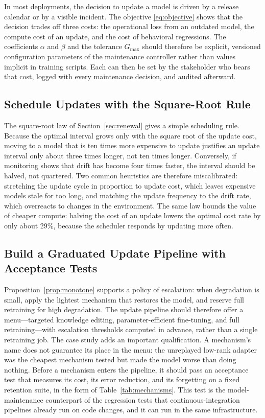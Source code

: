 \documentclass[electronics,article,submit,pdftex,moreauthors]{Definitions/mdpi}
\newcommand{\Gmax}{G_{\max}}
\begin{document}
In most deployments, the decision to update a model is driven by a release calendar or by a visible incident. The objective \eqref{eq:objective} shows that the decision trades off three costs: the operational loss from an outdated model, the compute cost of an update, and the cost of behavioral regressions. The coefficients $\alpha$ and $\beta$ and the tolerance $\Gmax$ should therefore be explicit, versioned configuration parameters of the maintenance controller rather than values implicit in training scripts. Each can then be set by the stakeholder who bears that cost, logged with every maintenance decision, and audited afterward.

\subsection{Schedule Updates with the Square-Root Rule}

The square-root law of Section~\ref{sec:renewal} gives a simple scheduling rule. Because the optimal interval grows only with the square root of the update cost, moving to a model that is ten times more expensive to update justifies an update interval only about three times longer, not ten times longer. Conversely, if monitoring shows that drift has become four times faster, the interval should be halved, not quartered. Two common heuristics are therefore miscalibrated: stretching the update cycle in proportion to update cost, which leaves expensive models stale for too long, and matching the update frequency to the drift rate, which overreacts to changes in the environment. The same law bounds the value of cheaper compute: halving the cost of an update lowers the optimal cost rate by only about 29\%, because the scheduler responds by updating more often.

\subsection{Build a Graduated Update Pipeline with Acceptance Tests}

Proposition~\ref{prop:monotone} supports a policy of escalation: when degradation is small, apply the lightest mechanism that restores the model, and reserve full retraining for high degradation. The update pipeline should therefore offer a menu---targeted knowledge editing, parameter-efficient fine-tuning, and full retraining---with escalation thresholds computed in advance, rather than a single retraining job. The case study adds an important qualification. A mechanism's name does not guarantee its place in the menu: the unreplayed low-rank adapter was the cheapest mechanism tested but made the model worse than doing nothing. Before a mechanism enters the pipeline, it should pass an acceptance test that measures its cost, its error reduction, and its forgetting on a fixed retention suite, in the form of Table~\ref{tab:mechanisms}. This test is the model-maintenance counterpart of the regression tests that continuous-integration pipelines already run on code changes, and it can run in the same infrastructure.
\end{document}
